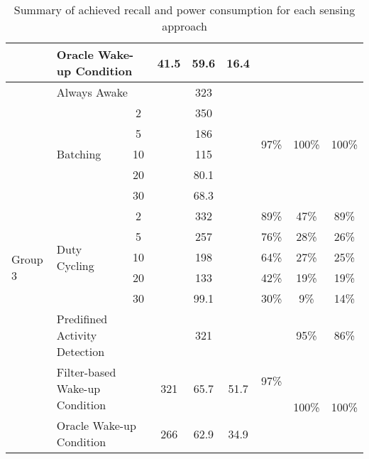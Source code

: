 \begin{table*}[t]
\begin{tabular}{|l|l|c|c|c|c|c|c|c|}
								& \multicolumn{2}{l|}{Oracle Wake-up Condition}			& 41.5		& 59.6		& 16.4			& 						& 							& 							\\ \hline \hline
	\multirow{14}{*}{Group 3}	& \multicolumn{2}{l|}{Always Awake}						& \multicolumn{3}{c|}{323}				& \multirow{6}{*}{97\%}	& \multirow{6}{*}{100\%}	& \multirow{6}{*}{100\%}	\\ \cline{2-6}
								& \multirow{5}{*}{Batching}		& 2						& \multicolumn{3}{c|}{350}				&						&							&							\\ \cline{3-6}
								& 								& 5						& \multicolumn{3}{c|}{186}				&						&							&							\\ \cline{3-6}
								& 								& 10					& \multicolumn{3}{c|}{115}				&						&							&							\\ \cline{3-6}
								& 								& 20					& \multicolumn{3}{c|}{80.1}				&						&							&							\\ \cline{3-6}
								& 								& 30					& \multicolumn{3}{c|}{68.3}				&						&							&							\\ \cline{2-9}
								& \multirow{5}{*}{Duty Cycling}	& 2						& \multicolumn{3}{c|}{332}				& 89\%					& 47\%						& 89\%						\\ \cline{3-9}
								& 								& 5						& \multicolumn{3}{c|}{257}				& 76\%					& 28\%						& 26\%						\\ \cline{3-9}
								& 								& 10					& \multicolumn{3}{c|}{198}				& 64\%					& 27\%						& 25\%						\\ \cline{3-9}
								& 								& 20					& \multicolumn{3}{c|}{133}				& 42\%					& 19\%						& 19\%						\\ \cline{3-9}
								& 								& 30					& \multicolumn{3}{c|}{99.1}				& 30\%					& 9\%						& 14\%						\\ \cline{2-9}
								& \multicolumn{2}{l|}{Predifined Activity Detection}	& \multicolumn{3}{c|}{321}				& \multirow{3}{*}{97\%}	& 95\%						& 86\%						\\ \cline{2-6}\cline{8-9}
								& \multicolumn{2}{l|}{Filter-based Wake-up Condition}	& 321		& 65.7		& 51.7			& 						& \multirow{2}{*}{100\%}	& \multirow{2}{*}{100\%}	\\ \cline{2-6}
								& \multicolumn{2}{l|}{Oracle Wake-up Condition}			& 266		& 62.9		& 34.9			& 						& 							& 							\\ \hline
    \end{tabular}
	\caption{Summary of achieved recall and power consumption for each sensing approach}
	\label{table:summaryAA-DC-BATCHING}
\end{table*}

